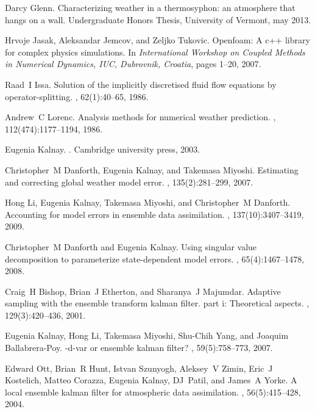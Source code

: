 \documentclass[pre,twocolumn,twoside,byrevtex,superscriptaddress]{revtex4}
\begin{document}
\begin{thebibliography}{10}
Darcy Glenn.
\newblock Characterizing weather in a thermosyphon: an atmosphere that hangs on
  a wall.
\newblock Undergraduate Honors Thesis, University of Vermont, may 2013.

Hrvoje Jasak, Aleksandar Jemcov, and Zeljko Tukovic.
\newblock Openfoam: A c++ library for complex physics simulations.
\newblock In {\em International Workshop on Coupled Methods in Numerical
  Dynamics, IUC, Dubrovnik, Croatia}, pages 1--20, 2007.

Raad~I Issa.
\newblock Solution of the implicitly discretised fluid flow equations by
  operator-splitting.
, 62(1):40--65, 1986.

Andrew~C Lorenc.
\newblock Analysis methods for numerical weather prediction.
,
  112(474):1177--1194, 1986.

Eugenia Kalnay.
.
\newblock Cambridge university press, 2003.

Christopher~M Danforth, Eugenia Kalnay, and Takemasa Miyoshi.
\newblock Estimating and correcting global weather model error.
, 135(2):281--299, 2007.

Hong Li, Eugenia Kalnay, Takemasa Miyoshi, and Christopher~M Danforth.
\newblock Accounting for model errors in ensemble data assimilation.
, 137(10):3407--3419, 2009.

Christopher~M Danforth and Eugenia Kalnay.
\newblock Using singular value decomposition to parameterize state-dependent
  model errors.
, 65(4):1467--1478, 2008.

Craig~H Bishop, Brian~J Etherton, and Sharanya~J Majumdar.
\newblock Adaptive sampling with the ensemble transform kalman filter. part i:
  Theoretical aspects.
, 129(3):420--436, 2001.

Eugenia Kalnay, Hong Li, Takemasa Miyoshi, Shu-Chih Yang, and Joaquim
  Ballabrera-Poy.
-d-var or ensemble kalman filter?
, 59(5):758--773, 2007.

Edward Ott, Brian~R Hunt, Istvan Szunyogh, Aleksey~V Zimin, Eric~J Kostelich,
  Matteo Corazza, Eugenia Kalnay, DJ~Patil, and James~A Yorke.
\newblock A local ensemble kalman filter for atmospheric data assimilation.
, 56(5):415--428, 2004.


\end{thebibliography}
\end{document}
